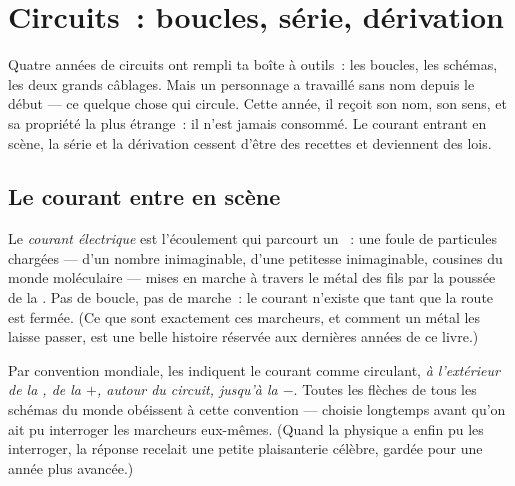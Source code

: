 \chapter{Circuits~: boucles, série, dérivation}\label{ch:g7:circuits-series-parallel}

Quatre années de circuits ont rempli ta boîte à outils~: les boucles,
les schémas, les deux grands câblages. Mais un personnage a travaillé
sans nom depuis le début --- ce quelque chose qui circule. Cette
année, il reçoit son nom, son sens, et sa propriété la plus
étrange~: il n'est jamais consommé. Le courant entrant en scène, la
série et la dérivation cessent d'être des recettes et deviennent des
lois.

\section{Le courant entre en scène}

\begin{definition}\label{def:g7:circuits-series-parallel:current}
Le \emph{courant électrique} est
l'écoulement qui parcourt un ~: une foule de particules
chargées --- d'un nombre inimaginable, d'une petitesse inimaginable,
cousines du monde moléculaire --- mises en marche à travers le métal
des fils par la poussée de la . Pas de boucle, pas de marche~: le
courant n'existe que tant que la route est fermée. (Ce que sont
exactement ces marcheurs, et comment un métal les laisse passer, est
une belle histoire réservée aux dernières années de ce livre.)
\end{definition}

\begin{proposition}\label{prop:g7:circuits-series-parallel:direction}
Par convention mondiale, les  indiquent le courant
comme circulant, \emph{à l'extérieur de la , de la  $+$,
autour du circuit, jusqu'à la  $-$}. Toutes les flèches de tous
les schémas du monde obéissent à cette convention --- choisie
longtemps avant qu'on ait pu interroger les marcheurs eux-mêmes.
(Quand la physique a enfin pu les interroger, la réponse recelait une
petite plaisanterie célèbre, gardée pour une année plus avancée.)
\end{proposition}

